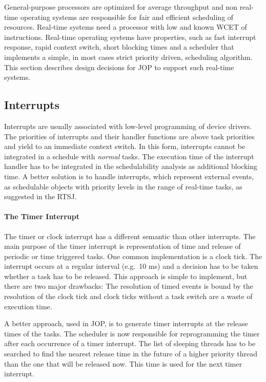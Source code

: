 General-purpose processors are optimized for average throughput and
non real-time operating systems are responsible for fair and
efficient scheduling of resources. Real-time systems need a
processor with low and known WCET of instructions. Real-time
operating systems have properties, such as fast interrupt response,
rapid context switch, short blocking times and a scheduler that
implements a simple, in most cases strict priority driven,
scheduling algorithm. This section describes design decisions for
JOP to support such real-time systems.

\subsection{Interrupts}

Interrupts are usually associated with low-level programming of
device drivers. The priorities of interrupts and their handler
functions are above task priorities and yield to an immediate
context switch. In this form, interrupts cannot be integrated in a
schedule with \emph{normal} tasks. The execution time of the
interrupt handler has to be integrated in the schedulability
analysis as additional blocking time. A better solution is to handle
interrupts, which represent external events, as schedulable objects
with priority levels in the range of real-time tasks, as suggested
in the RTSJ.

\paragraph{The Timer Interrupt}

The timer or clock interrupt has a different semantic than other
interrupts. The main purpose of the timer interrupt is
representation of time and release of periodic or time triggered
tasks. One common implementation is a clock tick. The interrupt
occurs at a regular interval (e.g.\ 10 ms) and a decision has to be
taken whether a task has to be released. This approach is simple to
implement, but there are two major drawbacks: The resolution of
timed events is bound by the resolution of the clock tick and clock
ticks without a task switch are a waste of execution time.

A better approach, used in JOP, is to generate timer interrupts at
the release times of the tasks. The scheduler is now responsible for
reprogramming the timer after each occurrence of a timer interrupt.
The list of sleeping threads has to be searched to find the nearest
release time in the future of a higher priority thread than the one
that will be released now. This time is used for the next timer
interrupt.

